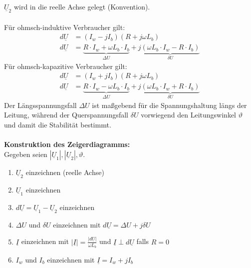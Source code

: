 \documentclass[a4paper,twocolumn,10pt]{article}
\begin{document}
$\underline{U}_2$ wird in die reelle Achse gelegt (Konvention).\\\\
Für ohmsch-induktive Verbraucher gilt:
\begin{equation*}
\begin{split}
d\underline{U}&=(I_w-jI_b)(R+j\omega L_b)\\
d\underline{U}&=\underbrace{R\cdot I_w+\omega L_b\cdot I_b}_{\Delta U}+j\underbrace{(\omega L_b\cdot I_w-R\cdot I_b)}_{\delta U}
\end{split}
\end{equation*}
Für ohmsch-kapazitive Verbraucher gilt:
\begin{equation*}
\begin{split}
d\underline{U}&=(I_w+jI_b)(R+j\omega L_b)\\
d\underline{U}&=\underbrace{R\cdot I_w-\omega L_b\cdot I_b}_{\Delta U}+j\underbrace{(\omega L_b\cdot I_w+R\cdot I_b)}_{\delta U}
\end{split}
\end{equation*}
Der Längsspannungsfall $\Delta U$ ist maßgebend für die Spannungshaltung längs der Leitung, während der Querspannungsfall $\delta U$ vorwiegend den Leitungswinkel $\vartheta$ und damit die Stabilität bestimmt.\\\\
\textbf{Konstruktion des Zeigerdiagramms:}\\
Gegeben seien $|\underline{U}_1|,|\underline{U}_2|,\vartheta$.
\begin{enumerate}
\item $\underline{U}_2$ einzeichnen (reelle Achse)
\item $\underline{U}_1$ einzeichnen
\item $d\underline{U}=\underline{U}_1-\underline{U}_2$ einzeichnen
\item $\Delta U$ und $\delta U$ einzeichnen mit $d\underline{U}=\Delta U+j\delta U$
\item $\underline{I}$ einzeichnen mit $|\underline{I}|=\frac{|d\underline{U}|}{\omega L_b}$ und $\underline{I}\perp d\underline{U}$ falls $R=0$
\item $I_w$ und $I_b$ einzeichnen mit $\underline{I}=I_w+jI_b$
\end{enumerate}
\end{document}
